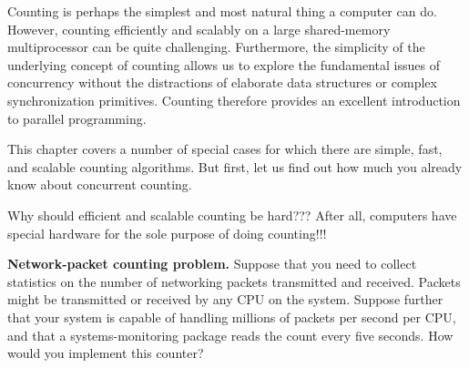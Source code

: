
%

Counting is perhaps the simplest and most natural thing a computer can do.
However, counting efficiently and scalably on a large
shared-memory multiprocessor can be quite challenging.
Furthermore, the simplicity of the underlying concept of counting
allows us to explore the fundamental issues of concurrency without
the distractions
of elaborate data structures or complex synchronization primitives.
Counting therefore provides an excellent introduction to
parallel programming.

This chapter covers a number of special cases for which there are simple,
fast, and scalable counting algorithms.
But first, let us find out how much you already know about concurrent
counting.

\QuickQuiz{}
	Why should efficient and scalable counting be hard???
	After all, computers have special hardware for the sole purpose
	of doing counting!!!
 \QuickQuizEnd

\QuickQuiz{}
	{ \bfseries Network-packet counting problem. }
	Suppose that you need to collect statistics on the number
	of networking packets transmitted and received.
	Packets might be transmitted or received by any CPU on the system.
	Suppose further that your system is capable of
	handling millions of packets per second per CPU, and that
	a systems-monitoring package reads the count every five seconds.
	How would you implement this counter?
 \QuickQuizEnd


